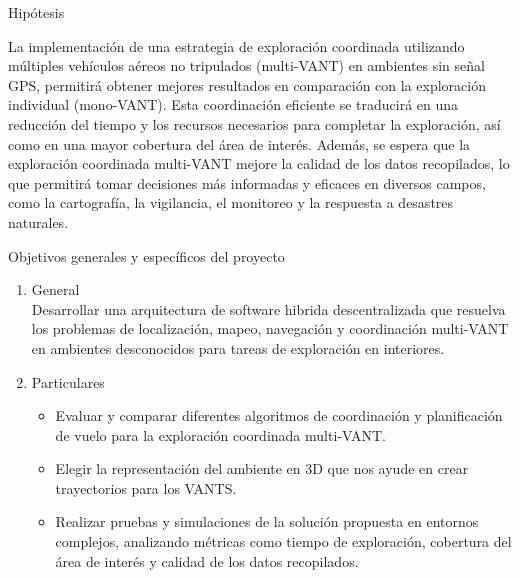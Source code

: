 \documentclass[
  24pt, %
  aspectratio=169, %
]{beamer}
\begin{document}
\begin{frame}{Hipótesis}

  La implementación de una estrategia de exploración coordinada utilizando múltiples vehículos aéreos no tripulados (multi-VANT) en ambientes sin señal GPS, permitirá obtener mejores resultados en comparación con la exploración individual (mono-VANT). Esta coordinación eﬁciente se traducirá en una reducción del tiempo y los recursos necesarios para completar la exploración, así como en una mayor cobertura del área de interés. Además, se espera que la exploración coordinada multi-VANT mejore la calidad de los datos recopilados, lo que permitirá tomar decisiones más informadas y eﬁcaces en diversos campos, como la cartografía, la vigilancia, el monitoreo y la respuesta a desastres naturales.
  
  
\end{frame}

\begin{frame}{Objetivos generales y específicos del proyecto}
  \begin{enumerate}
    \item General \\
    \bigskip
    Desarrollar una arquitectura de software hibrida descentralizada que resuelva los problemas de localización, mapeo, navegación y coordinación multi-VANT en ambientes desconocidos para tareas de exploración en interiores.
    \pause
    \item Particulares\\
    \bigskip
    \begin{itemize}
    \item Evaluar y comparar diferentes algoritmos de coordinación y planificación de vuelo para la exploración coordinada multi-VANT.
    \item Elegir la representación del ambiente en 3D que nos ayude en crear trayectorios para los VANTS.
    \item Realizar pruebas y simulaciones de la solución propuesta en entornos complejos, analizando métricas como tiempo de exploración, cobertura del área de interés y calidad de los datos recopilados.
    \end{itemize}
  \end{enumerate}
\end{frame}
\end{document}
